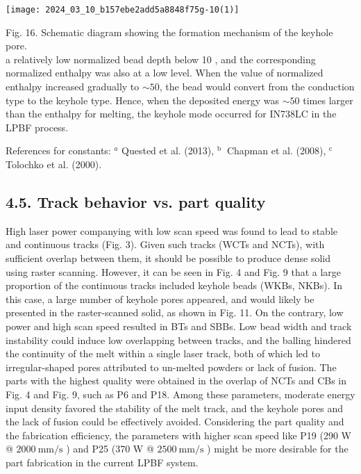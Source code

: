 \documentclass[10pt]{article}
\begin{document}
\begin{center}
\texttt{[image: 2024\_03\_10\_b157ebe2add5a8848f75g-10(1)]}
\end{center}

Fig. 16. Schematic diagram showing the formation mechanism of the keyhole pore.\\
a relatively low normalized bead depth below 10 , and the corresponding normalized enthalpy was also at a low level. When the value of normalized enthalpy increased gradually to $\sim 50$, the bead would convert from the conduction type to the keyhole type. Hence, when the deposited energy was $\sim 50$ times larger than the enthalpy for melting, the keyhole mode occurred for IN738LC in the LPBF process.

References for constants: ${ }^{a}$ Quested et al. (2013), ${ }^{\text {b }}$ Chapman et al. (2008), ${ }^{\text {c }}$ Tolochko et al. (2000).

\subsection*{4.5. Track behavior vs. part quality}
High laser power companying with low scan speed was found to lead to stable and continuous tracks (Fig. 3). Given such tracks (WCTs and NCTs), with sufficient overlap between them, it should be possible to produce dense solid using raster scanning. However, it can be seen in Fig. 4 and Fig. 9 that a large proportion of the continuous tracks included keyhole beads (WKBs, NKBs). In this case, a large number of keyhole pores appeared, and would likely be presented in the raster-scanned solid, as shown in Fig. 11. On the contrary, low power and high scan speed resulted in BTs and SBBs. Low bead width and track instability could induce low overlapping between tracks, and the balling hindered the continuity of the melt within a single laser track, both of which led to irregular-shaped pores attributed to un-melted powders or lack of fusion. The parts with the highest quality were obtained in the overlap of NCTs and CBs in Fig. 4 and Fig. 9, such as P6 and P18. Among these parameters, moderate energy input density favored the stability of the melt track, and the keyhole pores and the lack of fusion could be effectively avoided. Considering the part quality and the fabrication efficiency, the parameters with higher scan speed like P19 (290 W @ $2000 \mathrm{~mm} / \mathrm{s}$ ) and P25 (370 W @ $2500 \mathrm{~mm} / \mathrm{s}$ ) might be more desirable for the part fabrication in the current LPBF system.
\end{document}
